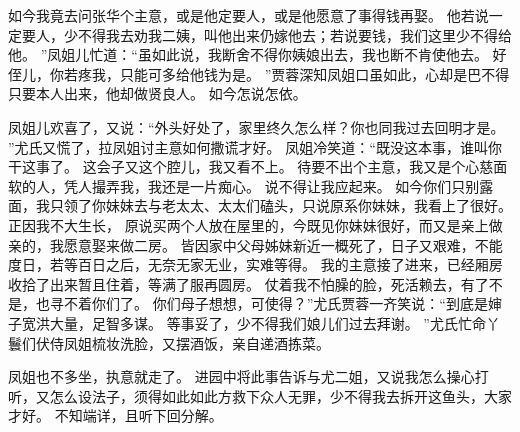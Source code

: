 如今我竟去问张华个主意，或是他定要人，或是他愿意了事得钱再娶。
他若说一定要人，少不得我去劝我二姨，叫他出来仍嫁他去；若说要钱，我们这里少不得给他。
”凤姐儿忙道：“虽如此说，我断舍不得你姨娘出去，我也断不肯使他去。
好侄儿，你若疼我，只能可多给他钱为是。
”贾蓉深知凤姐口虽如此，心却是巴不得只要本人出来，他却做贤良人。
如今怎说怎依。
\par
凤姐儿欢喜了，又说：“外头好处了，家里终久怎么样？你也同我过去回明才是。
”尤氏又慌了，拉凤姐讨主意如何撒谎才好。
凤姐冷笑道：“既没这本事，谁叫你干这事了。
这会子又这个腔儿，我又看不上。
待要不出个主意，我又是个心慈面软的人，凭人撮弄我，我还是一片痴心。
说不得让我应起来。
如今你们只别露面，我只领了你妹妹去与老太太、太太们磕头，只说原系你妹妹，我看上了很好。
正因我不大生长，
原说买两个人放在屋里的，今既见你妹妹很好，而又是亲上做亲的，我愿意娶来做二房。
皆因家中父母姊妹新近一概死了，日子又艰难，不能度日，若等百日之后，无奈无家无业，实难等得。
我的主意接了进来，已经厢房收拾了出来暂且住着，等满了服再圆房。
仗着我不怕臊的脸，死活赖去，有了不是，也寻不着你们了。
你们母子想想，可使得？”尤氏贾蓉一齐笑说：“到底是婶子宽洪大量，足智多谋。
等事妥了，少不得我们娘儿们过去拜谢。
”尤氏忙命丫鬟们伏侍凤姐梳妆洗脸，又摆酒饭，亲自递酒拣菜。
\par
凤姐也不多坐，执意就走了。
进园中将此事告诉与尤二姐，又说我怎么操心打听，又怎么设法子，须得如此如此方救下众人无罪，少不得我去拆开这鱼头，大家才好。
不知端详，且听下回分解。
\par
{}
